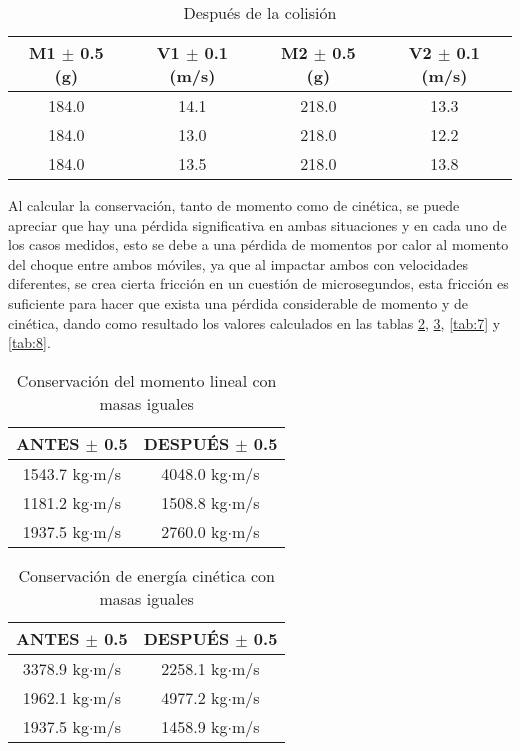 \documentclass{article}
\begin{document}
\begin{table}[H]
	\centering	
	\begin{tabular}{|c|c|c|c|}
\hline
M1 $\pm$ 0.5 (g) & V1 $\pm$ 0.1 (m/s) & M2 $\pm$ 0.5 (g) & V2 $\pm$ 0.1 (m/s) \\
\hline
184.0 & 14.1 & 218.0 & 13.3 \\
\hline
184.0 & 13.0 & 218.0 & 12.2 \\
\hline
184.0 & 13.5 & 218.0 & 13.8 \\
\hline
\end{tabular}
	\caption{Después de la colisión}
	\label{tab:4}
\end{table}

Al calcular la conservación, tanto de momento como de cinética, se puede apreciar que hay una pérdida significativa en ambas situaciones y en cada uno de los casos medidos, esto se debe a una pérdida de momentos por calor al momento del choque entre ambos móviles, ya que al impactar ambos con velocidades diferentes, se crea cierta fricción en un cuestión de microsegundos, esta fricción es suficiente para hacer que exista una pérdida considerable de momento y de cinética, dando como resultado los valores calculados en las tablas \ref{tab:5}, \ref{tab:6}, \ref{tab:7} y \ref{tab:8}.

\begin{table}[H]
	\centering	
	\begin{tabular}{|c|c|}
\hline
ANTES $\pm$ 0.5 & DESPUÉS $\pm$ 0.5 \\
\hline
1543.7 kg$\cdot$m/s & 4048.0 kg$\cdot$m/s \\
\hline
1181.2 kg$\cdot$m/s & 1508.8 kg$\cdot$m/s \\
\hline
1937.5 kg$\cdot$m/s & 2760.0 kg$\cdot$m/s \\
\hline
\end{tabular}
	\caption{Conservación del momento lineal con masas iguales}
	\label{tab:5}
\end{table}

\begin{table}[H]
	\centering	
	\begin{tabular}{|c|c|}
\hline
ANTES $\pm$ 0.5 & DESPUÉS $\pm$ 0.5 \\
\hline
3378.9 kg$\cdot$m/s & 2258.1 kg$\cdot$m/s \\
\hline
1962.1 kg$\cdot$m/s & 4977.2 kg$\cdot$m/s \\
\hline
1937.5 kg$\cdot$m/s & 1458.9 kg$\cdot$m/s \\
\hline
\end{tabular}	
	\caption{Conservación de energía cinética con masas iguales}
	\label{tab:6}
\end{table}
\end{document}
